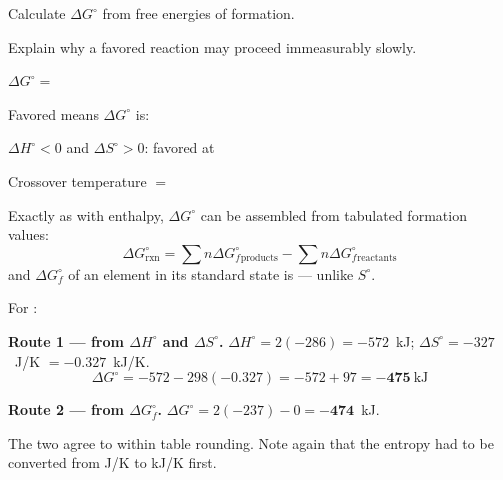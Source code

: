 \documentclass{apchem-notes}
\begin{document}
\begin{objectives}
  \item Calculate $\Delta G^\circ$ from free energies of formation.
  \item Explain why a favored reaction may proceed immeasurably slowly.
\end{objectives}


\begin{warmup}[4]
  \item $\Delta G^\circ = $ 
  \item Favored means $\Delta G^\circ$ is: 
  \item $\Delta H^\circ < 0$ and $\Delta S^\circ > 0$: favored at
  \item Crossover temperature $= $ 
\end{warmup}



Exactly as with enthalpy, $\Delta G^\circ$ can be assembled from tabulated
formation values:
\[ \Delta G^\circ_{\text{rxn}} = \sum n\Delta G_f^\circ{}_{\text{products}}
   - \sum n\Delta G_f^\circ{}_{\text{reactants}} \]
and $\Delta G_f^\circ$ of an element in its standard state is
 --- unlike $S^\circ$.

\begin{workedexample}
For :

\textbf{Route 1 --- from $\Delta H^\circ$ and $\Delta S^\circ$.}
$\Delta H^\circ = 2(-286) = -572$~kJ;
$\Delta S^\circ = -327$~J/K $= -0.327$~kJ/K.
\[ \Delta G^\circ = -572 - 298(-0.327) = -572 + 97
   = \mathbf{-475}~\text{kJ} \]

\textbf{Route 2 --- from $\Delta G_f^\circ$.}
$\Delta G^\circ = 2(-237) - 0 = \mathbf{-474}$~kJ.

The two agree to within table rounding. Note again that the entropy had to
be converted from J/K to kJ/K first.
\end{workedexample}

\end{document}
